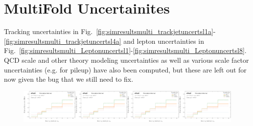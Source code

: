 \section{MultiFold Uncertainites}
\label{app:multiuncerts}

Tracking uncertainties in Fig.~\ref{fig:simresultsmulti_trackjetuncertsl1a}-\ref{fig:simresultsmulti_trackjetuncertsl4a} and lepton uncertainties in Fig.~\ref{fig:simresultsmulti_Leptonuncertsl1}-\ref{fig:simresultsmulti_Leptonuncertsl8}.  QCD scale and other theory modeling uncertainties as well as various scale factor uncertainties (e.g. for pileup) have also been computed, but these are left out for now given the bug that we still need to fix. 

\begin{figure}[h!]
\centering
\includegraphics[width=0.25\textwidth,page=1]{figures/SimResults/TrackJet_SystEffect.pdf}\includegraphics[width=0.25\textwidth,page=5]{figures/SimResults/TrackJet_SystEffect.pdf}\includegraphics[width=0.25\textwidth,page=9]{figures/SimResults/TrackJet_SystEffect.pdf}\includegraphics[width=0.25\textwidth,page=13]{figures/SimResults/TrackJet_SystEffect.pdf}\\

\end{figure}
